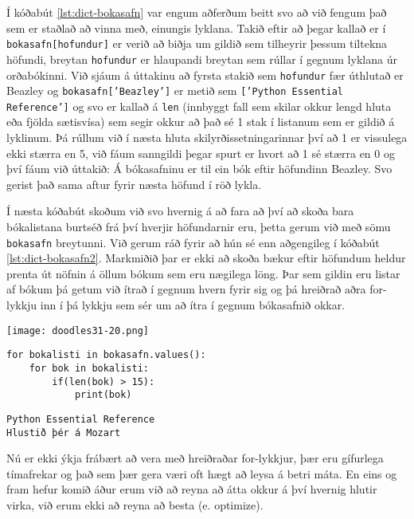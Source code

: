 Í kóðabút \ref{lst:dict-bokasafn} var engum aðferðum beitt svo að við fengum það sem er staðlað að vinna með, einungis lyklana.
Takið eftir að þegar kallað er í \texttt{bokasafn[hofundur]} er verið að biðja um gildið sem tilheyrir þessum tiltekna höfundi, breytan \texttt{hofundur} er hlaupandi breytan sem rúllar í gegnum lyklana úr orðabókinni.
Við sjáum á úttakinu að fyrsta stakið sem \texttt{hofundur} fær úthlutað er Beazley og \texttt{bokasafn['Beazley']} er metið sem \texttt{['Python Essential Reference']} og svo er kallað á \texttt{len} (innbyggt fall sem skilar okkur lengd hluta eða fjölda sætisvísa) sem segir okkur að það sé 1 stak í listanum sem er gildið á lyklinum.
Þá rúllum við í næsta hluta skilyrðissetningarinnar því að 1 er vissulega ekki stærra en 5, við fáum sanngildi þegar spurt er hvort að 1 sé stærra en 0 og því fáum við úttakið: Á bókasafninu er til ein bók eftir höfundinn Beazley.
Svo gerist það sama aftur fyrir næsta höfund í röð lykla.

Í næsta kóðabút skoðum við svo hvernig á að fara að því að skoða bara bókalistana burtséð frá því hverjir höfundarnir eru, þetta gerum við með sömu \texttt{bokasafn} breytunni.
Við gerum ráð fyrir að hún sé enn aðgengileg í kóðabút \ref{lst:dict-bokasafn2}.
Markmiðið þar er ekki að skoða bækur eftir höfundum heldur prenta út nöfnin á öllum bókum sem eru nægilega löng.
Þar sem gildin eru listar af bókum þá getum við ítrað í gegnum hvern fyrir sig og þá hreiðrað aðra for-lykkju inn í þá lykkju sem sér um að ítra í gegnum bókasafnið okkar.

	\begin{center}
		\texttt{[image: doodles31-20.png]}
	\end{center}
		
\begin{lstlisting}[caption=Ítrun í gegnum orðabækur með .values(), label=lst:dict-bokasafn2]
for bokalisti in bokasafn.values():
	for bok in bokalisti:
		if(len(bok) > 15):
			print(bok)
\end{lstlisting}
\lstset{style=uttak}
\begin{lstlisting}
Python Essential Reference
Hlustið þér á Mozart
\end{lstlisting}
\lstset{style=venjulegt}

Nú er ekki ýkja frábært að vera með hreiðraðar for-lykkjur, þær eru gífurlega tímafrekar og það sem þær gera væri oft hægt að leysa á betri máta.
En eins og fram hefur komið áður erum við að reyna að átta okkur á því hvernig hlutir virka, við erum ekki að reyna að besta (e. optimize).

